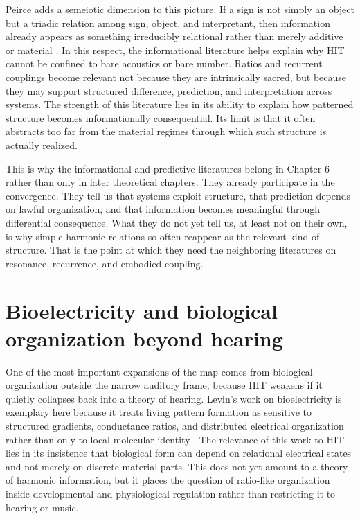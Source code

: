 Peirce adds a semeiotic dimension to this picture. If a sign is not simply an object but a triadic relation among sign, object, and interpretant, then information already appears as something irreducibly relational rather than merely additive or material \parencite{peirce_1931}. In this respect, the informational literature helps explain why HIT cannot be confined to bare acoustics or bare number. Ratios and recurrent couplings become relevant not because they are intrinsically sacred, but because they may support structured difference, prediction, and interpretation across systems. The strength of this literature lies in its ability to explain how patterned structure becomes informationally consequential. Its limit is that it often abstracts too far from the material regimes through which such structure is actually realized.

This is why the informational and predictive literatures belong in Chapter 6 rather than only in later theoretical chapters. They already participate in the convergence. They tell us that systems exploit structure, that prediction depends on lawful organization, and that information becomes meaningful through differential consequence. What they do not yet tell us, at least not on their own, is why simple harmonic relations so often reappear as the relevant kind of structure. That is the point at which they need the neighboring literatures on resonance, recurrence, and embodied coupling.

\section{Bioelectricity and biological organization beyond hearing}

One of the most important expansions of the map comes from biological organization outside the narrow auditory frame, because HIT weakens if it quietly collapses back into a theory of hearing. Levin's work on bioelectricity is exemplary here because it treats living pattern formation as sensitive to structured gradients, conductance ratios, and distributed electrical organization rather than only to local molecular identity \parencite{levin_2021}. The relevance of this work to HIT lies in its insistence that biological form can depend on relational electrical states and not merely on discrete material parts. This does not yet amount to a theory of harmonic information, but it places the question of ratio-like organization inside developmental and physiological regulation rather than restricting it to hearing or music.

